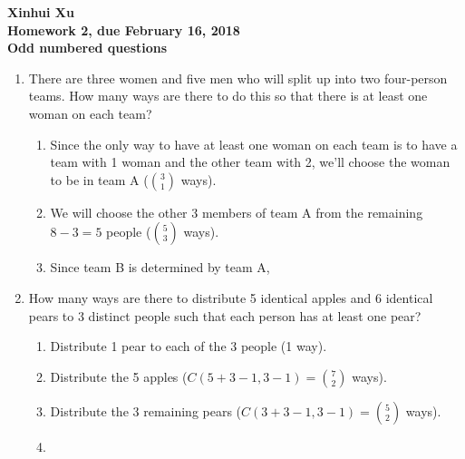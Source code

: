 \documentclass[12pt]{amsart}
\begin{document}
\begin{center}
  \bfseries
  Xinhui Xu\\
  Homework 2, due February 16, 2018\\
  Odd numbered questions
\end{center}

\bigskip

\begin{enumerate}
\item There are three women and five men who will split up into two four-person
teams. How many ways are there to do this so that there is at least one woman
on each team?
  \begin{enumerate}[label=(\roman*)]
  \item Since the only way to have at least one woman on each team is to have a team with 1 woman and the other team with 2, we'll choose the woman to be in team A ($\binom31$ ways).
  \item We will choose the other 3 members of team A from the remaining $8-3=5$ people ($\binom53$ ways).
  \item Since team B is determined by team A, \\
  \end{enumerate}

\item How many ways are there to distribute 5 identical apples and 6 identical pears
to 3 distinct people such that each person has at least one pear?
    \begin{enumerate}
        \item Distribute 1 pear to each of the 3 people (1 way).
        \item Distribute the 5 apples ($C(5+3-1, 3-1)=\binom72$ ways).
        \item Distribute the 3 remaining pears ($C(3+3-1, 3-1)=\binom52$ ways).
        \item {}
    \end{enumerate}



\end{enumerate}
\end{document}

